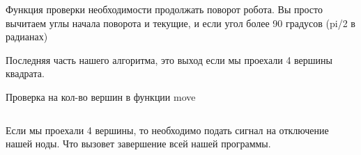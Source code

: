 \inputminted[fontsize=\footnotesize, linenos]{python}{2nd_tour/aero_sys/task_01/source_5.py}

Функция проверки необходимости продолжать поворот робота. Вы просто вычитаем углы начала поворота и текущие, и если угол более 90 градусов (pi/2 в радианах)

Последняя часть нашего алгоритма, это выход если мы проехали 4 вершины квадрата.

Проверка на кол-во вершин в функции move

\inputminted[fontsize=\footnotesize, linenos]{python}{2nd_tour/aero_sys/task_01/source_6.py}

Если мы проехали 4 вершины, то необходимо подать сигнал на отключение нашей ноды. Что вызовет завершение всей нашей программы. 

\codeExample


\inputminted[fontsize=\footnotesize, linenos]{python}{2nd_tour/aero_sys/task_01/source_7.py}